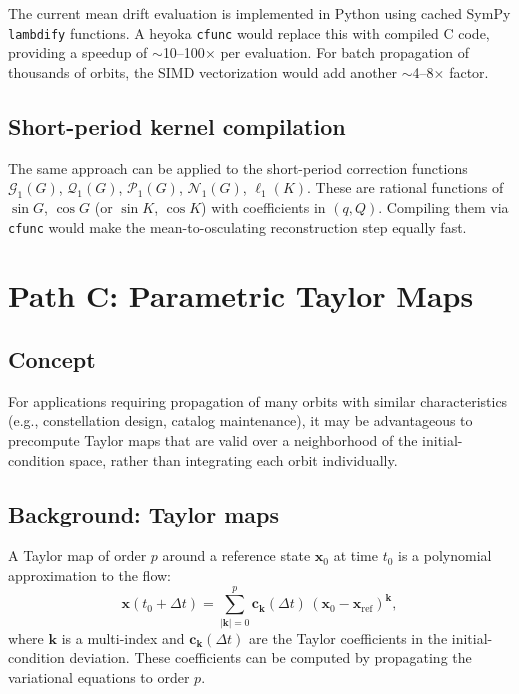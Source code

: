 \documentclass[11pt]{article}
\begin{document}
The current mean drift evaluation is implemented in Python using cached
SymPy \texttt{lambdify} functions. A heyoka \texttt{cfunc} would replace
this with compiled C code, providing a speedup of $\sim$10--100$\times$ per
evaluation. For batch propagation of thousands of orbits, the SIMD
vectorization would add another $\sim$4--8$\times$ factor.

\subsection{Short-period kernel compilation}

The same approach can be applied to the short-period correction functions
$\mathcal{G}_1(G)$, $\mathcal{Q}_1(G)$, $\mathcal{P}_1(G)$,
$\mathcal{N}_1(G)$, $\ell_1(K)$. These are rational functions of
$\sin G$, $\cos G$ (or $\sin K$, $\cos K$) with coefficients in $(q, Q)$.
Compiling them via \texttt{cfunc} would make the mean-to-osculating
reconstruction step equally fast.


\section{Path C: Parametric Taylor Maps}

\subsection{Concept}

For applications requiring propagation of many orbits with similar
characteristics (e.g., constellation design, catalog maintenance), it may be
advantageous to precompute Taylor maps that are valid over a neighborhood of
the initial-condition space, rather than integrating each orbit individually.

\subsection{Background: Taylor maps}

A Taylor map of order $p$ around a reference state $\bm x_0$ at time $t_0$
is a polynomial approximation to the flow:
\begin{equation}
\bm x(t_0 + \Delta t)
= \sum_{|\bm k| = 0}^{p}
\bm c_{\bm k}(\Delta t)\,
(\bm x_0 - \bm x_{\mathrm{ref}})^{\bm k},
\end{equation}
where $\bm k$ is a multi-index and $\bm c_{\bm k}(\Delta t)$ are the Taylor
coefficients in the initial-condition deviation. These coefficients can be
computed by propagating the variational equations to order $p$.
\end{document}
